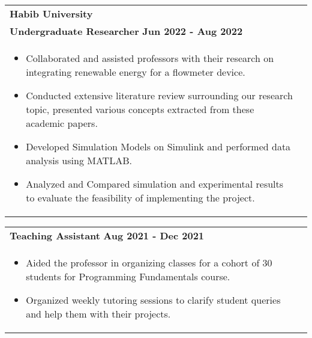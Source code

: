 \documentclass[a4paper,8pt]{article}
\begin{document}
\begin{tabularx}{\linewidth}{ @{}l r@{} }
\textbf{Habib University}  \\[4pt]
\textbf{Undergraduate Researcher} \hfill \textbf{Jun 2022 - Aug 2022} \\[4pt]
\begin{minipage}[t]{\linewidth}
    \begin{itemize}[nosep,after=\strut, leftmargin=1em, itemsep=2pt]
        \item Collaborated and assisted professors with their research on integrating renewable energy for a flowmeter device.
        \item Conducted extensive literature review surrounding our research topic, presented various concepts extracted from these academic papers.
        \item Developed Simulation Models on Simulink and performed data analysis using MATLAB.
        \item Analyzed and Compared simulation and experimental results to evaluate the feasibility of implementing the project.
    \end{itemize}
\end{minipage}

\end{tabularx}

\begin{tabularx}{\linewidth}{ @{}l r@{} }
\textbf{Teaching Assistant} \hfill \textbf{Aug 2021 - Dec 2021}
\\ [4pt]
\begin{minipage}[t]{\linewidth}
    \begin{itemize}[nosep,after=\strut, leftmargin=1em, itemsep=2pt]
        \item Aided the professor in organizing classes for a cohort of 30 students for Programming Fundamentals course.
        \item Organized weekly tutoring sessions to clarify student queries and help them with their projects.
    \end{itemize}
\end{minipage}
\end{tabularx}



\end{document}
